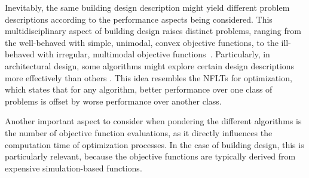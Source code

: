 	Inevitably, the same building design description might yield different problem descriptions according to the performance aspects being considered. This multidisciplinary aspect of building design raises distinct problems, ranging from the well-behaved with simple, unimodal, convex objective functions, to the ill-behaved with irregular, multimodal objective functions~\cite{Wortmann2017ADO}. Particularly, in architectural design, some algorithms might explore certain design descriptions more effectively than others%
	\cite{Wortmann2017GABESTCHOICE, Fang2017}. This idea resembles the \acp{NFLT} for optimization, which states that for any algorithm, better performance over one class of problems is offset by worse performance over another class\cite{Wolpert1997NFLT}. 
	
	Another important aspect to consider when pondering the different algorithms is the number of objective function evaluations, as it directly influences the computation time of optimization processes. In the case of building design, this is particularly relevant, because the objective functions are typically derived from expensive simulation-based functions.
		
